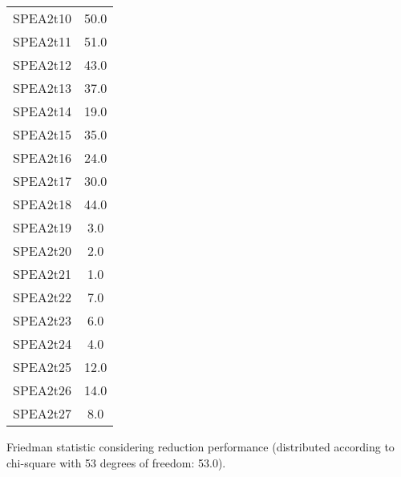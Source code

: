 \documentclass{article}
\begin{document}
\begin{table}[!htp]
\begin{tabular}{c|c}
SPEA2t10&50.0\\
SPEA2t11&51.0\\
SPEA2t12&43.0\\
SPEA2t13&37.0\\
SPEA2t14&19.0\\
SPEA2t15&35.0\\
SPEA2t16&24.0\\
SPEA2t17&30.0\\
SPEA2t18&44.0\\
SPEA2t19&3.0\\
SPEA2t20&2.0\\
SPEA2t21&1.0\\
SPEA2t22&7.0\\
SPEA2t23&6.0\\
SPEA2t24&4.0\\
SPEA2t25&12.0\\
SPEA2t26&14.0\\
SPEA2t27&8.0\\
\end{tabular}
\end{table}


Friedman statistic considering reduction performance (distributed according to chi-square with 53 degrees of freedom: 53.0).
\end{document}
